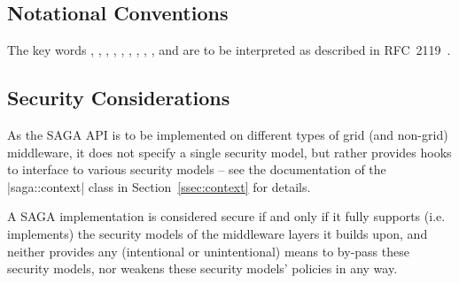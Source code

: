  
 \subsection{Notational Conventions}
 
   The key words \MUST, \MUSTNOT, \REQUIRED, \SHALL, \SHALLNOT,
   \SHOULD, \SHOULDNOT, \RECOMMENDED, \MAY, and \OPTIONAL are to
   be interpreted as described in
   RFC~2119~\cite{rfc-2119}.
 
 
 \subsection{Security Considerations}
 
  As the SAGA API is to be implemented on different types of
  grid (and non-grid) middleware, it does not
  specify a single security model, but rather provides hooks to
  interface to various security models -- see the documentation of the
  |saga::context| class in Section~\ref{ssec:context} for details.
 
  A SAGA implementation is considered secure if and only if it
  fully supports (i.e. implements) the security models of the
  middleware layers it builds upon, and neither provides any
  (intentional or unintentional) means to by-pass these security
  models, nor weakens these security models' policies in any
  way.
 
